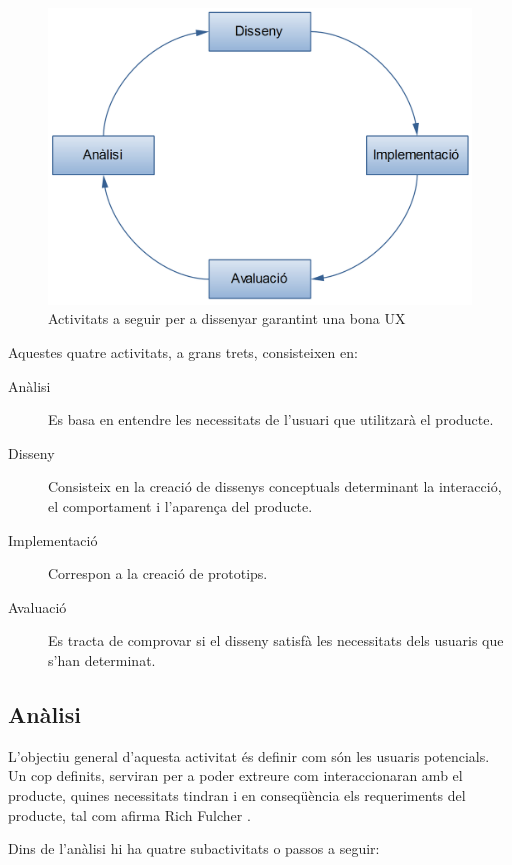 \begin{figure}[htp]
\centering
\includegraphics[scale=0.6]{UX_wheel.png}
\caption{Activitats a seguir per a dissenyar garantint una bona \ac{UX}}\label{fig:UX_lifecycle}
\end{figure}

Aquestes quatre activitats, a grans trets, consisteixen en:
\begin{description}
\item [Anàlisi] Es basa en entendre les necessitats de l'usuari que utilitzarà el producte.
\item [Disseny] Consisteix en la creació de dissenys conceptuals determinant la interacció, el comportament i l'aparença del producte.
\item [Implementació] Correspon a la creació de prototips.
\item [Avaluació] Es tracta de comprovar si el disseny satisfà les necessitats dels usuaris que s'han determinat.
\end{description}

\subsection{Anàlisi}\label{sec:analisi}
L'objectiu general d'aquesta activitat és definir com són les usuaris potencials. Un cop definits, serviran per a poder extreure com interaccionaran amb el producte, quines necessitats tindran i en conseqüència els requeriments del producte, tal com afirma Rich Fulcher \cite{user_centred_design}.

Dins de l'anàlisi hi ha quatre subactivitats o passos a seguir:

